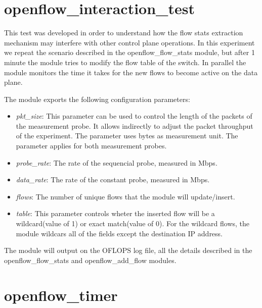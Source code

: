 \documentclass{book}
\begin{document}
\section{openflow\_interaction\_test}

This test was developed in order to understand how the flow stats extraction
mechanism may interfere with other control plane operations. In this experiment
we repeat the scenario described in the openflow\_flow\_stats module, but
after 1 minute the module tries to modify the flow table of the switch. In
parallel the module monitors the time it takes for the new flows to become
active on the data plane. 

The module exports the following configuration parameters:
\begin{itemize}
\item \emph{pkt\_size}: This parameter can be used to control the length of the
packets of the measurement probe. It allows indirectly to adjust the packet
throughput of the experiment. The parameter uses bytes as measurement unit.
The parameter applies for both measurement probes.
\item \emph{probe\_rate}: The rate of the sequencial probe, measured in
Mbps.
\item \emph{data\_rate}: The rate of the constant probe, measured in Mbps.
\item \emph{flows}:  The number of unique flows that the module will
update/insert.
\item \emph{table}:  This parameter controls wheter the inserted flow will
be
a wildcard(value of 1) or exact match(value of 0). For the wildcard 
flows, the module wildcars all of the fields except the destination IP address.
\end{itemize}

The module will output on the OFLOPS log file, all the details described in the
openflow\_flow\_stats and openflow\_add\_flow modules. 

\section{openflow\_timer}
\end{document}

